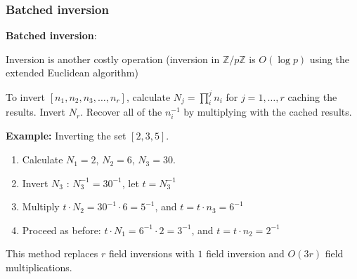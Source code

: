 \documentclass[options]{beamer}
\begin{document}
\begin{frame}
    \frametitle{Batched inversion}

    {\bf Batched inversion}:

    Inversion is another costly operation (inversion in $\mathbb{Z}/p\mathbb{Z}$ is $O(\log p)$ using the extended Euclidean algorithm)

    To invert $[n_1, n_2, n_3, \ldots, n_r]$, calculate $N_j = \prod_i^j n_i$ for $j = 1, \ldots, r$ caching the results. Invert $N_r$. Recover all of the $n_i^{-1}$ by multiplying with the cached results. 

    \vspace{6pt}
    \pause

    {\bf Example:} Inverting the set $[2, 3, 5]$.
    
    \begin{enumerate}
        \item Calculate $N_1 = 2$, $N_2 = 6$, $N_3 = 30$. 
    
        \item Invert $N_3$ : $N_3^{-1} = 30^{-1}$, let $t = N_3^{-1}$
        
        \item Multiply $t \cdot N_2 = 30^{-1} \cdot 6 = 5^{-1}$, and $t = t \cdot n_3 = 6^{-1}$
        
        \item Proceed as before: $t \cdot N_1 = 6^{-1} \cdot 2 = 3^{-1}$, and $t = t \cdot n_2 = 2^{-1}$
    \end{enumerate}

    This method replaces $r$ field inversions with $1$ field inversion and $O(3r)$ field multiplications. 
\end{frame}
\end{document}
